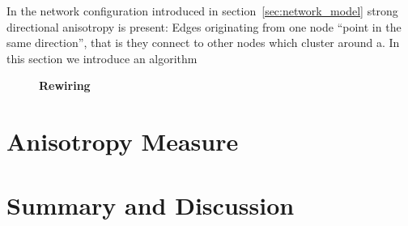 In the network configuration introduced in
section~\ref{sec:network_model} strong directional anisotropy is
present: Edges originating from one node \enquote{point in the same
  direction}, that is they connect to other nodes which cluster around
a. In this section we introduce an algorithm

\vspace{0.5cm}
\begin{figure}[h] 
  \centering 
  \caption{\textbf{Rewiring}}%
  \label{fig:distance_rewiring}
\end{figure}

 

\section{Anisotropy Measure}


\section{Summary and Discussion}













